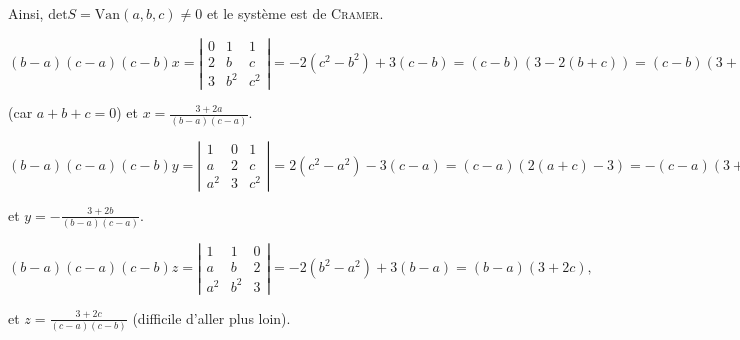 {{\begin{enumerate}
Ainsi, $\mbox{det}S=\mbox{Van}(a,b,c)\neq0$ et le système est de \textsc{Cramer}.

$$(b-a)(c-a)(c-b)x=\left|
\begin{array}{ccc}
0&1&1\\
2&b&c\\
3&b^2&c^2
\end{array}
\right|=-2(c^2-b^2)+3(c-b)=(c-b)(3-2(b+c))=(c-b)(3+2a),$$

(car $a+b+c=0$) et $x=\frac{3+2a}{(b-a)(c-a)}$.

$$(b-a)(c-a)(c-b)y=\left|
\begin{array}{ccc}
1&0&1\\
a&2&c\\
a^2&3&c^2
\end{array}
\right|=2(c^2-a^2)-3(c-a)=(c-a)(2(a+c)-3)=-(c-a)(3+2b),$$

et $y=-\frac{3+2b}{(b-a)(c-a)}$.

$$(b-a)(c-a)(c-b)z=\left|
\begin{array}{ccc}
1&1&0\\
a&b&2\\
a^2&b^2&3
\end{array}
\right|=-2(b^2-a^2)+3(b-a)=(b-a)(3+2c),$$

et $z=\frac{3+2c}{(c-a)(c-b)}$ (difficile d'aller plus loin).
\end{enumerate}}
}